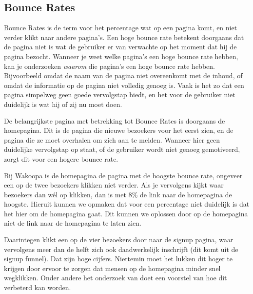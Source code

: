 \documentclass[a4paper, 10pt, pdftex]{report}
\begin{document}
    \subsection{Bounce Rates}
    Bounce Rates is de term voor het percentage wat op een pagina komt, en niet verder klikt naar andere pagina's. Een hoge bounce rate betekent doorgaans dat de pagina niet is wat de gebruiker er van verwachte op het moment dat hij de pagina bezocht. Wanneer je weet welke pagina's een hoge bounce rate hebben, kan je onderzoeken \emph{waarom} die pagina's een hoge bounce rate hebben. Bijvoorbeeld omdat de naam van de pagina niet overeenkomt met de inhoud, of omdat de informatie op de pagina niet volledig genoeg is. Vaak is het zo dat een pagina simpelweg geen goede vervolgstap biedt, en het voor de gebruiker niet duidelijk is wat hij of zij nu moet doen.

    De belangrijkste pagina met betrekking tot Bounce Rates is doorgaans de homepagina. Dit is de pagina die nieuwe bezoekers voor het eerst zien, en de pagina die ze moet overhalen om zich aan te melden. Wanneer hier geen duidelijke vervolgstap op staat, of de gebruiker wordt niet genoeg gemotiveerd, zorgt dit voor een hogere bounce rate.

    Bij Wakoopa is de homepagina de pagina met de hoogste bounce rate, ongeveer een op de twee bezoekers klikken niet verder. Als je vervolgens kijkt waar bezoekers dan w\'el op klikken, dan is met 8\% de link naar de homepagina de hoogste. Hieruit kunnen we opmaken dat voor een percentage niet duidelijk is dat het hier om de homepagina gaat. Dit kunnen we oplossen door op de homepagina niet de link naar de homepagina te laten zien.

    Daarintegen klikt een op de vier bezoekers door naar de signup pagina, waar vervolgens meer dan de helft zich ook daadwerkelijk inschrijft (dit komt uit de signup funnel). Dat zijn hoge cijfers. Niettemin moet het lukken dit hoger te krijgen door ervoor te zorgen dat mensen op de homepagina minder snel wegklikken. Onder andere het onderzoek van \cite{Hoekman2008} doet een voorstel van hoe dit verbeterd kan worden.
\end{document}
